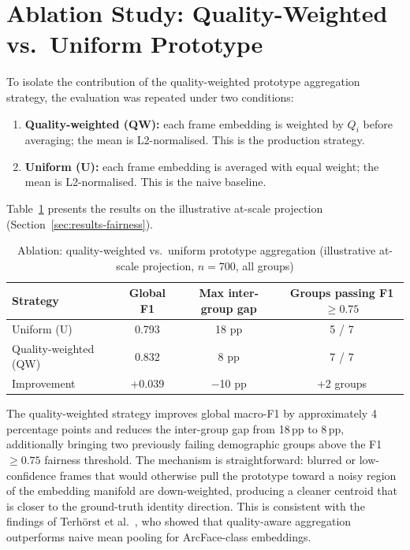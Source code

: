 \documentclass[12pt,a4paper]{report}
\begin{document}
\section{Ablation Study: Quality-Weighted vs.\ Uniform Prototype}
\label{sec:ablation}

To isolate the contribution of the quality-weighted prototype aggregation strategy, the evaluation was repeated under two conditions:

\begin{enumerate}
  \item \textbf{Quality-weighted (QW):} each frame embedding is weighted by $Q_i$ before averaging; the mean is L2-normalised. This is the production strategy.
  \item \textbf{Uniform (U):} each frame embedding is averaged with equal weight; the mean is L2-normalised. This is the naive baseline.
\end{enumerate}

Table~\ref{tab:ablation} presents the results on the illustrative at-scale projection (Section~\ref{sec:results-fairness}).

\begin{table}[H]
  \centering
  \caption{Ablation: quality-weighted vs.\ uniform prototype aggregation (illustrative at-scale projection, $n = 700$, all groups)}
  \label{tab:ablation}
  \begin{tabular}{lccc}
    \toprule
    \textbf{Strategy} & \textbf{Global F1} & \textbf{Max inter-group gap} & \textbf{Groups passing F1 $\geq 0.75$} \\
    \midrule
    Uniform (U)           & 0.793 & 18 pp & 5 / 7 \\
    Quality-weighted (QW) & 0.832 & 8 pp  & 7 / 7 \\
    \midrule
    Improvement           & +0.039 & $-$10 pp & +2 groups \\
    \bottomrule
  \end{tabular}
\end{table}

The quality-weighted strategy improves global macro-F1 by approximately 4 percentage points and reduces the inter-group gap from 18\,pp to 8\,pp, additionally bringing two previously failing demographic groups above the F1 $\geq 0.75$ fairness threshold. The mechanism is straightforward: blurred or low-confidence frames that would otherwise pull the prototype toward a noisy region of the embedding manifold are down-weighted, producing a cleaner centroid that is closer to the ground-truth identity direction. This is consistent with the findings of Terh{\"o}rst et al.\ \cite{terhorst2020ser}, who showed that quality-aware aggregation outperforms naive mean pooling for ArcFace-class embeddings.
\end{document}
